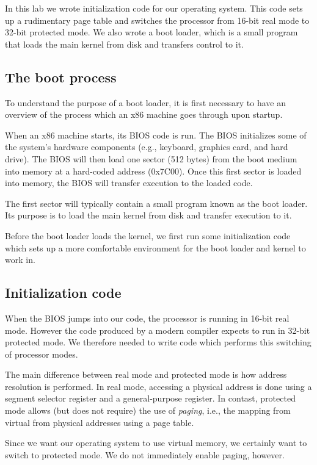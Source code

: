 \documentclass{article}
\begin{document}
In this lab we wrote initialization code for our operating system. This code
sets up a rudimentary page table and switches the processor from 16-bit real
mode to 32-bit protected mode. We also wrote a boot loader, which is a small
program that loads the main kernel from disk and transfers control to it.

\subsection{The boot process}
To understand the purpose of a boot loader, it is first necessary to have an
overview of the process which an x86 machine goes through upon startup.

When an x86 machine starts, its BIOS code is run. The BIOS initializes some of
the system's hardware components (e.g., keyboard, graphics card, and hard
drive). The BIOS will then load one sector (512 bytes) from the boot medium
into memory at a hard-coded address (0x7C00). Once this first sector is loaded
into memory, the BIOS will transfer execution to the loaded code.

The first sector will typically contain a small program known as the boot
loader. Its purpose is to load the main kernel from disk and transfer
execution to it.

Before the boot loader loads the kernel, we first run some initialization code
which sets up a more comfortable environment for the boot loader and kernel to
work in.



\subsection{Initialization code}
When the BIOS jumps into our code, the processor is running in 16-bit real
mode. However the code produced by a modern compiler expects to run in 32-bit
protected mode. We therefore needed to write code which performs this
switching of processor modes.

The main difference between real mode and protected mode is how address
resolution is performed. In real mode, accessing a physical address is done
using a segment selector register and a general-purpose register. In
contast, protected mode allows (but does not require) the use of
\emph{paging}, i.e., the mapping from virtual from physical addresses using a
page table.

Since we want our operating system to use virtual memory, we certainly want to
switch to protected mode. We do not immediately enable paging, however.
\end{document}
